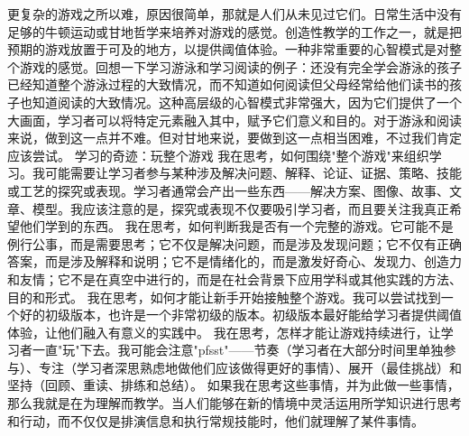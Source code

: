 更复杂的游戏之所以难，原因很简单，那就是人们从未见过它们。日常生活中没有足够的牛顿运动或甘地哲学来培养对游戏的感觉。创造性教学的工作之一，就是把预期的游戏放置于可及的地方，以提供阈值体验。一种非常重要的心智模式是对整个游戏的感觉。回想一下学习游泳和学习阅读的例子：还没有完全学会游泳的孩子已经知道整个游泳过程的大致情况，而不知道如何阅读但父母经常给他们读书的孩子也知道阅读的大致情况。这种高层级的心智模式非常强大，因为它们提供了一个大画面，学习者可以将特定元素融入其中，赋予它们意义和目的。对于游泳和阅读来说，做到这一点并不难。但对甘地来说，要做到这一点相当困难，不过我们肯定应该尝试。
学习的奇迹：玩整个游戏
我在思考，如何围绕"整个游戏"来组织学习。我可能需要让学习者参与某种涉及解决问题、解释、论证、证据、策略、技能或工艺的探究或表现。学习者通常会产出一些东西——解决方案、图像、故事、文章、模型。我应该注意的是，探究或表现不仅要吸引学习者，而且要关注我真正希望他们学到的东西。
我在思考，如何判断我是否有一个完整的游戏。它可能不是例行公事，而是需要思考；它不仅是解决问题，而是涉及发现问题；它不仅有正确答案，而是涉及解释和说明；它不是情绪化的，而是激发好奇心、发现力、创造力和友情；它不是在真空中进行的，而是在社会背景下应用学科或其他实践的方法、目的和形式。
我在思考，如何才能让新手开始接触整个游戏。我可以尝试找到一个好的初级版本，也许是一个非常初级的版本。初级版本最好能给学习者提供阈值体验，让他们融入有意义的实践中。
我在思考，怎样才能让游戏持续进行，让学习者一直"玩"下去。我可能会注意"pfsst"——节奏（学习者在大部分时间里单独参与）、专注（学习者深思熟虑地做他们应该做得更好的事情）、展开（最佳挑战）和坚持（回顾、重读、排练和总结）。
如果我在思考这些事情，并为此做一些事情，那么我就是在为理解而教学。当人们能够在新的情境中灵活运用所学知识进行思考和行动，而不仅仅是排演信息和执行常规技能时，他们就理解了某件事情。
